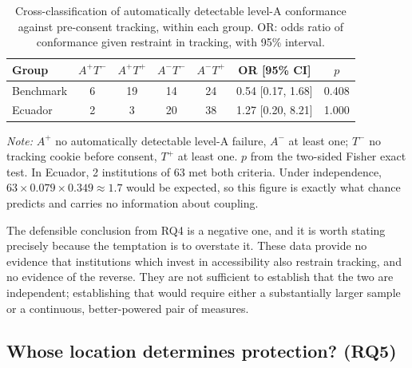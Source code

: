 \documentclass[]{interact}
\begin{document}
\begin{table}[htbp]
	\centering
	\caption{Cross-classification of automatically detectable level-A conformance against pre-consent tracking, within each group. OR: odds ratio of conformance given restraint in tracking, with 95\% interval.}\label{tab:joint}
	\small
	\begin{tabular}{@{}lcccccc@{}}
		\toprule
		\textbf{Group} & $A^{+}T^{-}$ & $A^{+}T^{+}$ & $A^{-}T^{-}$ & $A^{-}T^{+}$ & \textbf{OR [95\% CI]} & \textbf{$p$} \\
		\midrule
		Benchmark & 6 & 19 & 14 & 24 & 0.54 [0.17, 1.68] & 0.408 \\
		Ecuador & 2 & 3 & 20 & 38 & 1.27 [0.20, 8.21] & 1.000 \\
		\bottomrule
	\end{tabular}
	\par\vspace{3pt}
	\footnotesize\RaggedRight\textit{Note:} $A^{+}$ no automatically detectable level-A failure, $A^{-}$ at least one; $T^{-}$ no tracking cookie before consent, $T^{+}$ at least one. $p$ from the two-sided Fisher exact test. In Ecuador, 2 institutions of 63 met both criteria. Under independence, $63 \times 0.079 \times 0.349 \approx 1.7$ would be expected, so this figure is exactly what chance predicts and carries no information about coupling.
\end{table}

The defensible conclusion from RQ4 is a negative one, and it is worth stating precisely because the temptation is to overstate it. These data provide no evidence that institutions which invest in accessibility also restrain tracking, and no evidence of the reverse. They are not sufficient to establish that the two are independent; establishing that would require either a substantially larger sample or a continuous, better-powered pair of measures.

\subsection{Whose location determines protection? (RQ5)}\label{sec:results-vantage}
\end{document}
